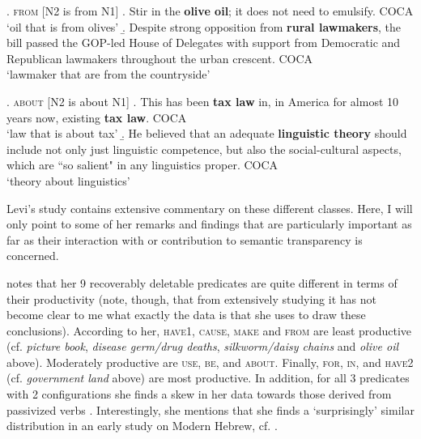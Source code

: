 \ex. \textsc{from} [N2 is from N1]
\a. \label{ex:olive_oil}
Stir in the \textbf{olive oil}; it does not need to emulsify. COCA
\\
`oil that is from olives'
\b. \label{ex:rural_lawmakers}
Despite strong opposition from \textbf{rural lawmakers}, the bill passed
the GOP-led House of Delegates with support from Democratic and Republican
lawmakers throughout the urban crescent. COCA
\\
`lawmaker that are from the countryside'

\ex. \textsc{about} [N2 is about N1]
\a.  \label{ex:tax_law}
This has been \textbf{tax law} in, in America for almost 10 years now, existing \textbf{tax law}. COCA
\\`law that is about tax'
\b. \label{ex:linguistic_theory}
He believed that an adequate \textbf{linguistic theory} should include not
only just linguistic competence, but also the social-cultural aspects, which
are ``so salient" in any linguistics proper. COCA
\\
`theory about linguistics'

Levi's study contains extensive commentary on these different classes. Here, I
will only point to some of her remarks and findings that are particularly
important as far as their interaction with or contribution to semantic
transparency is concerned.

\citet[85--86]{Levi:1978} notes that her 9 recoverably deletable predicates
are quite different in terms of their productivity (note, though, that
from extensively studying \citealt{Levi:1978} it has not become clear
to me what exactly the data is that she uses to draw these conclusions). 
According to her, \textsc{have1}, \textsc{cause}, \textsc{make} and
\textsc{from} are least productive (cf. \emph{picture book}, \emph{disease
  germ/drug deaths}, \emph{silkworm/daisy chains} and \emph{olive oil}
above). Moderately productive are \textsc{use}, \textsc{be}, and
\textsc{about}. Finally, \textsc{for}, \textsc{in}, and \textsc{have2}
(cf. \emph{government land} above) are
most productive. In addition, for all 3 predicates with 2 configurations
she finds a skew in her data towards those derived from passivized
verbs \citep[86]{Levi:1978}. Interestingly, she mentions that she finds a
`surprisingly' similar distribution in an early study on Modern Hebrew, cf. \citet{Levi:1976}. 


